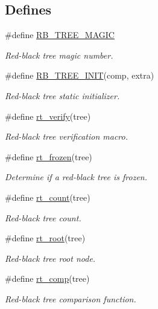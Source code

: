 \subsection*{Defines}
\begin{CompactItemize}
\item 
\#define \hyperlink{group__dbprim__rbtree_ga16}{RB\_\-TREE\_\-MAGIC}
\begin{CompactList}\small\item\em Red-black tree magic number. \item\end{CompactList}\item 
\#define \hyperlink{group__dbprim__rbtree_ga17}{RB\_\-TREE\_\-INIT}(comp, extra)
\begin{CompactList}\small\item\em Red-black tree static initializer. \item\end{CompactList}\item 
\#define \hyperlink{group__dbprim__rbtree_ga18}{rt\_\-verify}(tree)
\begin{CompactList}\small\item\em Red-black tree verification macro. \item\end{CompactList}\item 
\#define \hyperlink{group__dbprim__rbtree_ga19}{rt\_\-frozen}(tree)
\begin{CompactList}\small\item\em Determine if a red-black tree is frozen. \item\end{CompactList}\item 
\#define \hyperlink{group__dbprim__rbtree_ga20}{rt\_\-count}(tree)
\begin{CompactList}\small\item\em Red-black tree count. \item\end{CompactList}\item 
\#define \hyperlink{group__dbprim__rbtree_ga21}{rt\_\-root}(tree)
\begin{CompactList}\small\item\em Red-black tree root node. \item\end{CompactList}\item 
\#define \hyperlink{group__dbprim__rbtree_ga22}{rt\_\-comp}(tree)
\begin{CompactList}\small\item\em Red-black tree comparison function. \item\end{CompactList}\item 

\end{CompactItemize}
